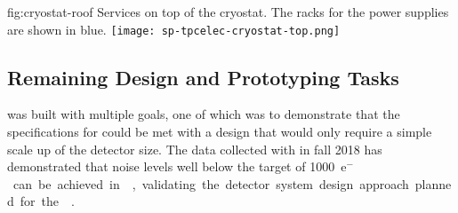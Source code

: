 \begin{dunefigure}
{fig:cryostat-roof}
{Services on top of the cryostat. The racks for the  power supplies are shown in blue.}
\texttt{[image: sp-tpcelec-cryostat-top.png]}
\end{dunefigure}

\subsection{Remaining Design and Prototyping Tasks}
\label{sec:fdsp-tpcelec-overview-remaining}

  was %
 built with multiple
goals, one of which was to demonstrate that the specifications
for  could be met with a design that would only require a simple
scale up of the detector size. The data collected with 
in fall 2018 has demonstrated that noise levels well below the target
of \SI{1000}{e$^-$} can be achieved in \lar, validating the
detector system design approach planned for the  .

